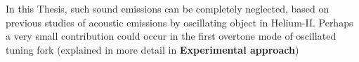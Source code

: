 In this Thesis, such sound emissions can be completely neglected, based on previous studies of acoustic emissions by oscillating object in Helium-II. Perhaps a very small contribution could occur in the first overtone mode of oscillated tuning fork (explained in more detail in \textbf{Experimental approach})

%

